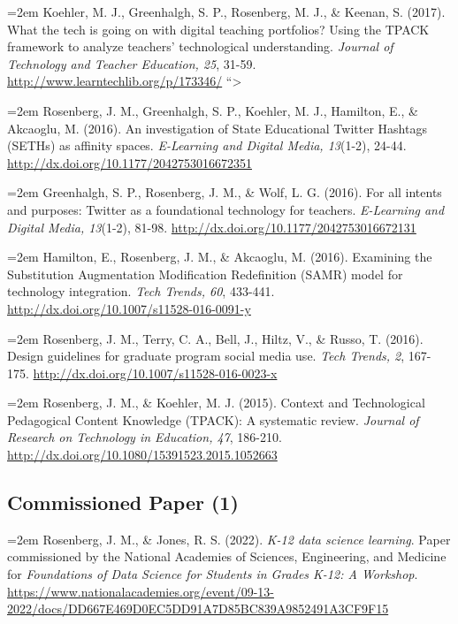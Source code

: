 \documentclass[
  14,
]{article}
\begin{document}
\hangindent=2em Koehler, M. J., Greenhalgh, S. P., Rosenberg, M. J., \&
Keenan, S. (2017). What the tech is going on with digital teaching
portfolios? Using the TPACK framework to analyze teachers' technological
understanding. \emph{Journal of Technology and Teacher Education, 25},
31-59. \url{http://www.learntechlib.org/p/173346/} ``\textgreater{}

\hangindent=2em Rosenberg, J. M., Greenhalgh, S. P., Koehler, M. J.,
Hamilton, E., \& Akcaoglu, M. (2016). An investigation of State
Educational Twitter Hashtags (SETHs) as affinity spaces.
\emph{E-Learning and Digital Media, 13}(1-2), 24-44.
\url{http://dx.doi.org/10.1177/2042753016672351}

\hangindent=2em Greenhalgh, S. P., Rosenberg, J. M., \& Wolf, L. G.
(2016). For all intents and purposes: Twitter as a foundational
technology for teachers. \emph{E-Learning and Digital Media, 13}(1-2),
81-98. \url{http://dx.doi.org/10.1177/2042753016672131}

\hangindent=2em Hamilton, E., Rosenberg, J. M., \& Akcaoglu, M. (2016).
Examining the Substitution Augmentation Modification Redefinition (SAMR)
model for technology integration. \emph{Tech Trends, 60}, 433-441.
\url{http://dx.doi.org/10.1007/s11528-016-0091-y}

\hangindent=2em Rosenberg, J. M., Terry, C. A., Bell, J., Hiltz, V., \&
Russo, T. (2016). Design guidelines for graduate program social media
use. \emph{Tech Trends, 2}, 167-175.
\url{http://dx.doi.org/10.1007/s11528-016-0023-x}

\hangindent=2em Rosenberg, J. M., \& Koehler, M. J. (2015). Context and
Technological Pedagogical Content Knowledge (TPACK): A systematic
review. \emph{Journal of Research on Technology in Education, 47},
186-210. \url{http://dx.doi.org/10.1080/15391523.2015.1052663}

\hypertarget{commissioned-paper-1}{%
\subsection{Commissioned Paper (1)}\label{commissioned-paper-1}}

\hangindent=2em Rosenberg, J. M., \& Jones, R. S. (2022). \emph{K-12
data science learning}. Paper commissioned by the National Academies of
Sciences, Engineering, and Medicine for \emph{Foundations of Data
Science for Students in Grades K-12: A Workshop}.
\url{https://www.nationalacademies.org/event/09-13-2022/docs/DD667E469D0EC5DD91A7D85BC839A9852491A3CF9F15}
\end{document}
